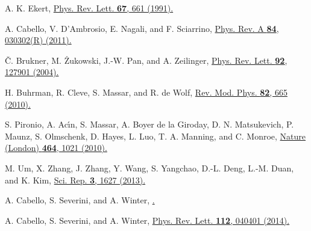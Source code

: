 \documentclass[prl,letterpaper,english,reprint,nofootinbib,aps,superscriptaddress,showpacs,showkeys]{revtex4-1}
\theoremstyle{definition}
\theoremstyle{remark}
\begin{document}
\begin{thebibliography}{10}
 A. K. Ekert,
 \href{http://journals.aps.org/prl/abstract/10.1103/PhysRevLett.67.661}{Phys. Rev. Lett. \textbf{67}, 661 (1991).}

 A. Cabello, V. D'Ambrosio, E. Nagali, and F. Sciarrino,
 \href{http://journals.aps.org/pra/abstract/10.1103/PhysRevA.84.030302}{Phys. Rev. A \textbf{84}, 030302(R) (2011).}


 \v{C}. Brukner, M. \.{Z}ukowski, J.-W. Pan, and A. Zeilinger,
 \href{http://journals.aps.org/prl/abstract/10.1103/PhysRevLett.92.127901}{Phys. Rev. Lett. \textbf{92}, 127901 (2004).}

 H. Buhrman, R. Cleve, S. Massar, and R. de Wolf,
 \href{http://journals.aps.org/rmp/abstract/10.1103/RevModPhys.82.665}{Rev. Mod. Phys. \textbf{82}, 665 (2010).}


 S. Pironio, A. Ac\'{\i}n, S. Massar, A. Boyer de la Giroday,
 D. N. Matsukevich, P. Maunz, S. Olmschenk, D. Hayes, L. Luo, T. A. Manning, and C. Monroe,
 \href{http://www.nature.com/nature/journal/v464/n7291/full/nature09008.html}{Nature (London) \textbf{464}, 1021 (2010).}

 M. Um, X. Zhang, J. Zhang, Y. Wang, S. Yangchao, D.-L. Deng, L.-M. Duan, and K. Kim,
 \href{http://www.nature.com/srep/2013/130409/srep01627/full/srep01627.html}{Sci. Rep. \textbf{3}, 1627 (2013).}



 A. Cabello, S. Severini, and A. Winter,
 \href{http://arxiv.org/abs/1010.2163}{.}

 A. Cabello, S. Severini, and A. Winter,
 \href{http://journals.aps.org/prl/abstract/10.1103/PhysRevLett.112.040401}{Phys. Rev. Lett. \textbf{112}, 040401 (2014).}
 

\end{thebibliography}
\end{document}
